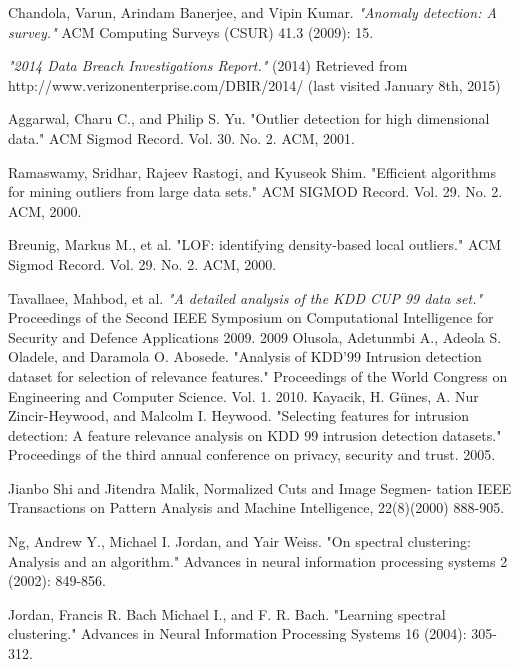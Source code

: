\begin{thebibliography}{9}

Chandola, Varun, Arindam Banerjee, and Vipin Kumar. \emph{"Anomaly detection: A survey."} ACM Computing Surveys (CSUR) 41.3 (2009): 15.

\emph{"2014 Data Breach Investigations Report."} (2014) Retrieved from http://www.verizonenterprise.com/DBIR/2014/ (last visited January 8th, 2015)

Aggarwal, Charu C., and Philip S. Yu. "Outlier detection for high dimensional data." ACM Sigmod Record. Vol. 30. No. 2. ACM, 2001.

Ramaswamy, Sridhar, Rajeev Rastogi, and Kyuseok Shim. "Efficient algorithms for mining outliers from large data sets." ACM SIGMOD Record. Vol. 29. No. 2. ACM, 2000.

Breunig, Markus M., et al. "LOF: identifying density-based local outliers." ACM Sigmod Record. Vol. 29. No. 2. ACM, 2000.

Tavallaee, Mahbod, et al. \emph{"A detailed analysis of the KDD CUP 99 data set."} Proceedings of the Second IEEE Symposium on Computational Intelligence for Security and Defence Applications 2009. 2009
Olusola, Adetunmbi A., Adeola S. Oladele, and Daramola O. Abosede. "Analysis of KDD’99 Intrusion detection dataset for selection of relevance features." Proceedings of the World Congress on Engineering and Computer Science. Vol. 1. 2010.
Kayacik, H. Günes, A. Nur Zincir-Heywood, and Malcolm I. Heywood. "Selecting features for intrusion detection: A feature relevance analysis on KDD 99 intrusion detection datasets." Proceedings of the third annual conference on privacy, security and trust. 2005.

Jianbo Shi and Jitendra Malik, Normalized Cuts and Image Segmen- tation IEEE Transactions on Pattern Analysis and Machine Intelligence, 22(8)(2000) 888-905.

Ng, Andrew Y., Michael I. Jordan, and Yair Weiss. "On spectral clustering: Analysis and an algorithm." Advances in neural information processing systems 2 (2002): 849-856.

Jordan, Francis R. Bach Michael I., and F. R. Bach. "Learning spectral clustering." Advances in Neural Information Processing Systems 16 (2004): 305-312.


\end{thebibliography}
